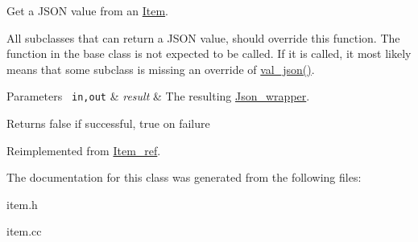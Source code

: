 Get a J\+S\+ON value from an \mbox{\hyperlink{classItem}{Item}}.

All subclasses that can return a J\+S\+ON value, should override this function. The function in the base class is not expected to be called. If it is called, it most likely means that some subclass is missing an override of \mbox{\hyperlink{classItem__direct__view__ref_a4b28cab9b54ffdfe277bd2c26cb50709}{val\+\_\+json()}}.


\begin{DoxyParams}[1]{Parameters}
\mbox{\texttt{ in,out}}  & {\em result} & The resulting \mbox{\hyperlink{classJson__wrapper}{Json\+\_\+wrapper}}.\\
\hline
\end{DoxyParams}
\begin{DoxyReturn}{Returns}
false if successful, true on failure 
\end{DoxyReturn}


Reimplemented from \mbox{\hyperlink{classItem__ref_ab7fe1fd26301ae6f9692105dc06403f1}{Item\+\_\+ref}}.



The documentation for this class was generated from the following files\+:\begin{DoxyCompactItemize}
\item 
item.\+h\item 
item.\+cc\end{DoxyCompactItemize}
